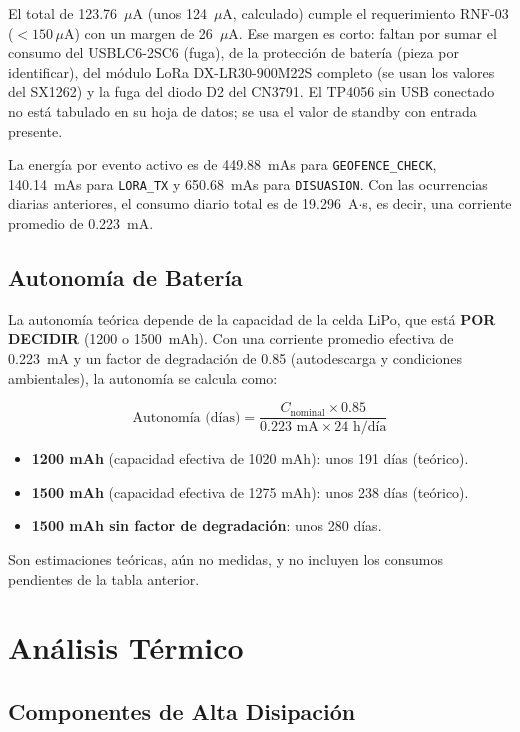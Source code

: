 El total de 123.76~$\mu$A (unos 124~$\mu$A, calculado) cumple el requerimiento RNF-03 ($<150\,\mu$A) con un margen de 26~$\mu$A. Ese margen es corto: faltan por sumar el consumo del USBLC6-2SC6 (fuga), de la protección de batería (pieza por identificar), del módulo LoRa DX-LR30-900M22S completo (se usan los valores del SX1262) y la fuga del diodo D2 del CN3791. El TP4056 sin USB conectado no está tabulado en su hoja de datos; se usa el valor de standby con entrada presente.

La energía por evento activo es de 449.88~mAs para \texttt{GEOFENCE\_CHECK}, 140.14~mAs para \texttt{LORA\_TX} y 650.68~mAs para \texttt{DISUASION}. Con las ocurrencias diarias anteriores, el consumo diario total es de 19.296~A$\cdot$s, es decir, una corriente promedio de 0.223~mA.

\subsection{Autonomía de Batería}

La autonomía teórica depende de la capacidad de la celda LiPo, que está \textbf{POR DECIDIR} (1200 o 1500~mAh). Con una corriente promedio efectiva de 0.223~mA y un factor de degradación de 0.85 (autodescarga y condiciones ambientales), la autonomía se calcula como:

$$\text{Autonomía (días)} = \frac{C_{\text{nominal}} \times 0.85}{0.223\text{ mA} \times 24\text{ h/día}}$$

\begin{itemize}[leftmargin=*]
    \item \textbf{1200 mAh} (capacidad efectiva de 1020 mAh): unos 191 días (teórico).
    \item \textbf{1500 mAh} (capacidad efectiva de 1275 mAh): unos 238 días (teórico).
    \item \textbf{1500 mAh sin factor de degradación}: unos 280 días.
\end{itemize}

Son estimaciones teóricas, aún no medidas, y no incluyen los consumos pendientes de la tabla anterior.

\section{Análisis Térmico}

\subsection{Componentes de Alta Disipación}

